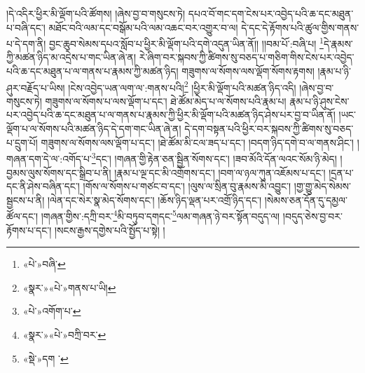 །དེ་འདིར་ཕྱིར་མི་ལྡོག་པའི་ཚོགས། །ཞེས་བྱ་བ་གསུངས་ཏེ། དཔའ་བོ་གང་དག་ངེས་པར་འབྱེད་པའི་ཆ་དང་མཐུན་པ་བཞི་དང་། མཐོང་བའི་ལམ་དང་བསྒོམ་པའི་ལམ་འཆང་བར་འགྱུར་བ་ལ། དེ་དང་དེ་རྟོགས་པའི་ཚུལ་གྱིས་གནས་པ་དེ་དག་ནི། བྱང་ཆུབ་སེམས་དཔའ་སློབ་པ་ཕྱིར་མི་ལྡོག་པའི་དགེ་འདུན་ཡིན་ནོ།། །།བམ་པོ་:བཞི་པ། \footnote{«པེ་»བཞི་}དེ་རྣམས་ཀྱི་མཚན་ཉིད་མ་འདྲེས་པ་གང་ཡིན་ཞེ་ན། རེ་ཞིག་བར་སྐབས་ཀྱི་ཚིགས་སུ་བཅད་པ་གཅིག་གིས་ངེས་པར་འབྱེད་པའི་ཆ་དང་མཐུན་པ་ལ་གནས་པ་རྣམས་ཀྱི་མཚན་ཉིད། གཟུགས་ལ་སོགས་ལས་ལྡོག་སོགས་རྟགས། །རྣམ་པ་ཉི་ཤུར་བརྗོད་པ་ཡིས། །ངེས་འབྱེད་ཡན་ལག་ལ་:གནས་པའི།\footnote{«སྣར་»«པེ་»གནས་པ་ཡི།} །ཕྱིར་མི་ལྡོག་པའི་མཚན་ཉིད་འདི། །ཞེས་བྱ་བ་གསུངས་ཏེ། གཟུགས་ལ་སོགས་པ་ལས་ལྡོག་པ་དང་། ཐེ་ཚོམ་མེད་པ་ལ་སོགས་པའི་རྣམ་པ། རྣམ་པ་ཉི་ཤུས་ངེས་པར་འབྱེད་པའི་ཆ་དང་མཐུན་པ་ལ་གནས་པ་རྣམས་ཀྱི་ཕྱིར་མི་ལྡོག་པའི་མཚན་ཉིད་ཤེས་པར་བྱ་བ་ཡིན་ནོ། །ཡང་ལྡོག་པ་ལ་སོགས་པའི་མཚན་ཉིད་དེ་དག་གང་ཡིན་ཞེ་ན། དེ་དག་བསྟན་པའི་ཕྱིར་བར་སྐབས་ཀྱི་ཚིགས་སུ་བཅད་པ་དྲུག་པོ། གཟུགས་ལ་སོགས་ལས་ལྡོག་པ་དང་། །ཐེ་ཚོམ་མི་ངལ་ཟད་པ་དང་། །བདག་ཉིད་དགེ་བ་ལ་གནས་ཤིང་། །གཞན་དག་དེ་ལ་:འགོད་པ་\footnote{«པེ་»འགོག་པ་}དང་། །གཞན་གྱི་རྟེན་ཅན་སྦྱིན་སོགས་དང་། །ཟབ་མོའི་དོན་ལའང་སོམ་ཉི་མེད། །བྱམས་ལུས་སོགས་དང་སྒྲིབ་པ་ནི། །རྣམ་པ་ལྔ་དང་མི་འགྲོགས་དང་། །བག་ལ་ཉལ་ཀུན་འཇོམས་པ་དང་། །དྲན་པ་དང་ནི་ཤེས་བཞིན་དང་། །གོས་ལ་སོགས་པ་གཙང་བ་དང་། །ལུས་ལ་སྲིན་བུ་རྣམས་མི་འབྱུང་། །གྱ་གྱུ་མེད་སེམས་སྦྱངས་པ་ནི། །ལེན་དང་སེར་སྣ་མེད་སོགས་དང་། །ཆོས་ཉིད་ལྡན་པར་འགྲོ་ཉིད་དང་། །སེམས་ཅན་དོན་དུ་དམྱལ་ཚོལ་དང་། །གཞན་གྱིས་:དཀྲི་བར་\footnote{«སྣར་»«པེ་»བཀྲི་བར་}མི་བཏུབ་དགདང་\footnote{«སྡེ་»དག ་}ལམ་གཞན་ཉེ་བར་སྟོན་བདུད་ལ། །བདུད་ཅེས་བྱ་བར་རྟོགས་པ་དང་། །སངས་རྒྱས་དགྱེས་པའི་སྤྱོད་པ་སྟེ། །
